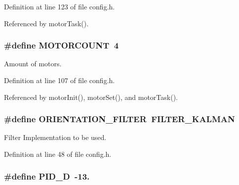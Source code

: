 Definition at line 123 of file config.\-h.



Referenced by motor\-Task().

\hypertarget{group__config_ga1a2c496f8bb7dbb5f1dfef5c32624a6d}{
\subsubsection[{M\-O\-T\-O\-R\-C\-O\-U\-N\-T}]{\setlength{\rightskip}{0pt plus 5cm}\#define M\-O\-T\-O\-R\-C\-O\-U\-N\-T~4}}\label{group__config_ga1a2c496f8bb7dbb5f1dfef5c32624a6d}


Amount of motors. 



Definition at line 107 of file config.\-h.



Referenced by motor\-Init(), motor\-Set(), and motor\-Task().

\hypertarget{group__config_gaf45c761b3bd949068c77712e21259564}{
\subsubsection[{O\-R\-I\-E\-N\-T\-A\-T\-I\-O\-N\-\_\-\-F\-I\-L\-T\-E\-R}]{\setlength{\rightskip}{0pt plus 5cm}\#define O\-R\-I\-E\-N\-T\-A\-T\-I\-O\-N\-\_\-\-F\-I\-L\-T\-E\-R~F\-I\-L\-T\-E\-R\-\_\-\-K\-A\-L\-M\-A\-N}}\label{group__config_gaf45c761b3bd949068c77712e21259564}


Filter Implementation to be used. 



Definition at line 48 of file config.\-h.

\hypertarget{group__config_ga2a442b8579a5c5f9526e824165125497}{
\subsubsection[{P\-I\-D\-\_\-\-D}]{\setlength{\rightskip}{0pt plus 5cm}\#define P\-I\-D\-\_\-\-D~-\/13.}}\label{group__config_ga2a442b8579a5c5f9526e824165125497}



